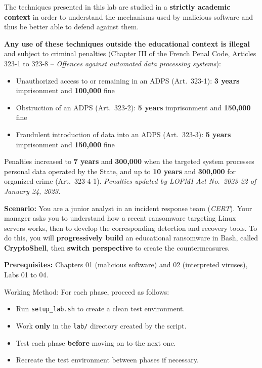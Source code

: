 \documentclass[a4paper,11pt]{article}
\theoremstyle{plain}
\theoremstyle{definition}
\begin{document}
\begin{ethique}
The techniques presented in this lab are studied in a \textbf{strictly academic context} in order to understand the mechanisms used by malicious software and thus be better able to defend against them.

\textbf{Any use of these techniques outside the educational context is illegal} and subject to criminal penalties (Chapter III of the French Penal Code, Articles 323-1 to 323-8 -- \textit{Offences against automated data processing systems}):
\begin{itemize}
    \item Unauthorized access to or remaining in an ADPS (Art.~323-1): \textbf{3 years} imprisonment and \textbf{\texteuro{}100,000} fine
    \item Obstruction of an ADPS (Art.~323-2): \textbf{5 years} imprisonment and \textbf{\texteuro{}150,000} fine
    \item Fraudulent introduction of data into an ADPS (Art.~323-3): \textbf{5 years} imprisonment and \textbf{\texteuro{}150,000} fine
\end{itemize}
Penalties increased to \textbf{7 years} and \textbf{\texteuro{}300,000} when the targeted system processes personal data operated by the State, and up to \textbf{10 years} and \textbf{\texteuro{}300,000} for organized crime (Art.~323-4-1). \textit{Penalties updated by LOPMI Act No.~2023-22 of January 24, 2023.}
\end{ethique}

\bigskip


\noindent
\textbf{Scenario:} You are a junior analyst in an incident response team (\textit{CERT}). Your manager asks you to understand how a recent ransomware targeting Linux servers works, then to develop the corresponding detection and recovery tools. To do this, you will \textbf{progressively build} an educational ransomware in Bash, called \textbf{CryptoShell}, then \textbf{switch perspective} to create the countermeasures.

\medskip
\noindent\textbf{Prerequisites:} Chapters 01 (malicious software) and 02 (interpreted viruses), Labs 01 to 04.

\bigskip

{\Large Working Method:} For each phase, proceed as follows:
\begin{itemize}
\item Run \texttt{setup\_lab.sh} to create a clean test environment.
\item Work \textbf{only} in the \texttt{lab/} directory created by the script.
\item Test each phase \textbf{before} moving on to the next one.
\item Recreate the test environment between phases if necessary.
\end{itemize}
\end{document}
